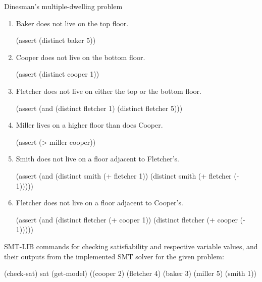 \documentclass{beamer}
\begin{document}
\begin{frame}[fragile,t]
\begin{columns}[t,onlytextwidth]
\begin{column}{0.485\textwidth}
\begin{block}{Dinesman's multiple-dwelling problem}
\begin{enumerate}
				\item Baker does not live on the top floor.
				\begin{smtlib}
					(assert (distinct baker 5))
				\end{smtlib}
			
				\item Cooper does not live on the bottom floor.
				\begin{smtlib}
					(assert (distinct cooper 1))
				\end{smtlib}
				
				\item Fletcher does not live on either the top or the bottom floor.
				\begin{smtlib}
					(assert (and (distinct fletcher 1)
					             (distinct fletcher 5)))
				\end{smtlib}
			
				\item Miller lives on a higher floor than does Cooper.
				\begin{smtlib}
					(assert (> miller cooper))
				\end{smtlib}
			
				\item Smith does not live on a floor adjacent to Fletcher's.
				\begin{smtlib}
					(assert (and (distinct smith (+ fletcher 1))
					             (distinct smith (+ fletcher (- 1)))))
				\end{smtlib}
			
				\item Fletcher does not live on a floor adjacent to Cooper's.
				\begin{smtlib}
					(assert (and (distinct fletcher (+ cooper 1))
					             (distinct fletcher (+ cooper (- 1)))))
				\end{smtlib}
			\end{enumerate}
		
			SMT-LIB commands for checking satisfiability and respective variable values, and their outputs from the implemented SMT solver for the given problem:
			\begin{smtlib}
				(check-sat)
				sat
				(get-model)
				((cooper 2) (fletcher 4) (baker 3) (miller 5) (smith 1))
			\end{smtlib}
		\end{block}
	

\end{column}
\end{columns}
\end{frame}
\end{document}
